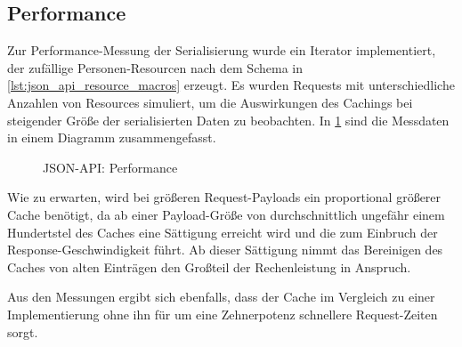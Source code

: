 \subsection{Performance}
\label{ssec:bj_performance}

Zur Performance-Messung der Serialisierung wurde ein Iterator implementiert,
der zufällige Personen-Resourcen nach dem Schema in
\cref{lst:json_api_resource_macros} erzeugt.  Es wurden Requests mit
unterschiedliche Anzahlen von Resources simuliert, um die Auswirkungen des
Cachings bei steigender Größe der serialisierten Daten zu beobachten.  In
\cref{fig:json_api_performance} sind die Messdaten in einem Diagramm
zusammengefasst.

\begin{figure}
	\center
	
	\caption{JSON-API: Performance}
	\label{fig:json_api_performance}
\end{figure}

Wie zu erwarten, wird bei größeren Request-Payloads ein proportional größerer
Cache benötigt, da ab einer Payload-Größe von durchschnittlich ungefähr einem
Hundertstel des Caches eine Sättigung erreicht wird und die zum Einbruch der
Response-Geschwindigkeit führt.  Ab dieser Sättigung nimmt das Bereinigen des
Caches von alten Einträgen den Großteil der Rechenleistung in Anspruch.

Aus den Messungen ergibt sich ebenfalls, dass der Cache im Vergleich zu einer
Implementierung ohne ihn für um eine Zehnerpotenz schnellere Request-Zeiten
sorgt.
